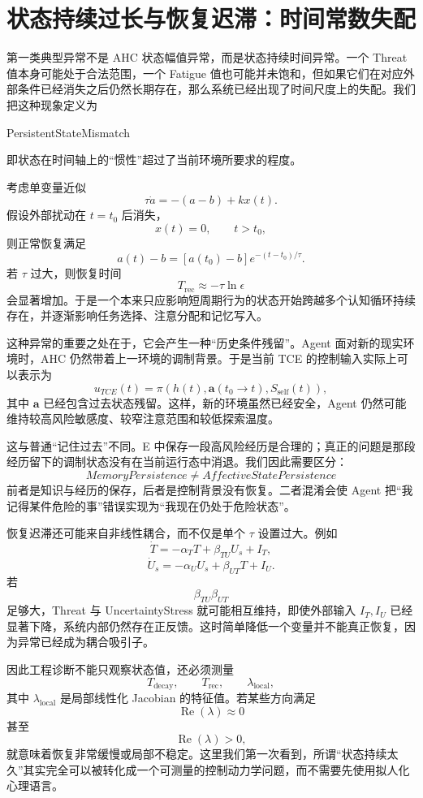\section{状态持续过长与恢复迟滞：时间常数失配}
\label{sec:ahc_persistence}

第一类典型异常不是 AHC 状态幅值异常，而是状态持续时间异常。一个 Threat 值本身可能处于合法范围，一个 Fatigue 值也可能并未饱和，但如果它们在对应外部条件已经消失之后仍然长期存在，那么系统已经出现了时间尺度上的失配。我们把这种现象定义为
\begin{statementbox}
PersistentStateMismatch
\end{statementbox}
即状态在时间轴上的“惯性”超过了当前环境所要求的程度。

考虑单变量近似
\[
\tau\dot a
=
-(a-b)+kx(t).
\]
假设外部扰动在 $t=t_0$ 后消失，
\[
x(t)=0,\qquad t>t_0,
\]
则正常恢复满足
\[
a(t)-b
=
\left[
a(t_0)-b
\right]
e^{-(t-t_0)/\tau}.
\]
若 $\tau$ 过大，则恢复时间
\[
T_{\mathrm{rec}}
\approx
-\tau
\ln\epsilon
\]
会显著增加。于是一个本来只应影响短周期行为的状态开始跨越多个认知循环持续存在，并逐渐影响任务选择、注意分配和记忆写入。

这种异常的重要之处在于，它会产生一种“历史条件残留”。Agent 面对新的现实环境时，AHC 仍然带着上一环境的调制背景。于是当前 TCE 的控制输入实际上可以表示为
\[
u_{TCE}(t)
=
\pi
\left(
h(t),
\mathbf a(t_0\!\rightarrow\!t),
S_{\mathrm{self}}(t)
\right),
\]
其中 $\mathbf a$ 已经包含过去状态残留。这样，新的环境虽然已经安全，Agent 仍然可能维持较高风险敏感度、较窄注意范围和较低探索温度。

这与普通“记住过去”不同。E 中保存一段高风险经历是合理的；真正的问题是那段经历留下的调制状态没有在当前运行态中消退。我们因此需要区分：
\[
\boxed{
MemoryPersistence
\neq
AffectiveStatePersistence
}
\]
前者是知识与经历的保存，后者是控制背景没有恢复。二者混淆会使 Agent 把“我记得某件危险的事”错误实现为“我现在仍处于危险状态”。

恢复迟滞还可能来自非线性耦合，而不仅是单个 $\tau$ 设置过大。例如
\[
\dot T
=
-\alpha_T T
+
\beta_{TU}U_s
+
I_T,
\]
\[
\dot U_s
=
-\alpha_U U_s
+
\beta_{UT}T
+
I_U.
\]
若
\[
\beta_{TU}\beta_{UT}
\]
足够大，Threat 与 UncertaintyStress 就可能相互维持，即使外部输入 $I_T,I_U$ 已经显著下降，系统内部仍然存在正反馈。这时简单降低一个变量并不能真正恢复，因为异常已经成为耦合吸引子。

因此工程诊断不能只观察状态值，还必须测量
\[
T_{\mathrm{decay}},
\qquad
T_{\mathrm{rec}},
\qquad
\lambda_{\mathrm{local}},
\]
其中 $\lambda_{\mathrm{local}}$ 是局部线性化 Jacobian 的特征值。若某些方向满足
\[
\operatorname{Re}(\lambda)\approx0
\]
甚至
\[
\operatorname{Re}(\lambda)>0,
\]
就意味着恢复非常缓慢或局部不稳定。这里我们第一次看到，所谓“状态持续太久”其实完全可以被转化成一个可测量的控制动力学问题，而不需要先使用拟人化心理语言。

